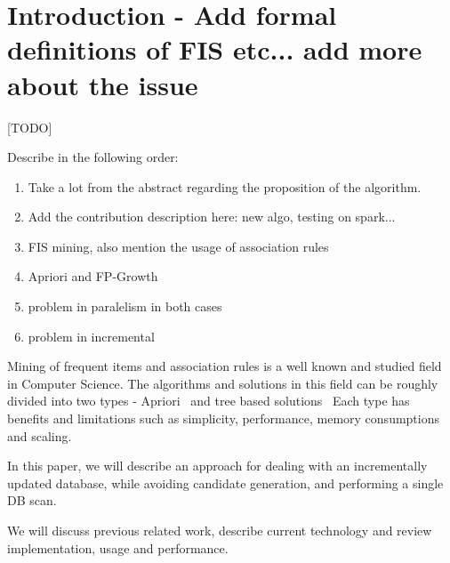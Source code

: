 \section{Introduction - Add formal definitions of FIS etc...  add more about the issue}
[TODO] 

Describe in the following order:
\begin{enumerate}
\item Take a lot from the abstract regarding the proposition of the algorithm.
\item Add the contribution description here: new algo, testing on spark...
\item FIS mining, also mention the usage of association rules 
\item Apriori and FP-Growth 
\item problem in paralelism in both cases 
\item problem in incremental
\end{enumerate}

Mining of frequent items and association rules is a well known and studied field in Computer Science.
 The algorithms and solutions in this field can be roughly divided into two types - Apriori~\cite{agrawal1994fast} and tree based solutions~\cite{tsay2009fiut,leung2005cantree,tanbeer2009efficient} Each type has benefits and limitations such as simplicity, performance, memory consumptions and scaling. 


In this paper, we will describe an approach for dealing with an incrementally updated database, while avoiding candidate generation, and performing a single DB scan.

We will discuss previous related work, describe current technology and review implementation, usage and performance.

